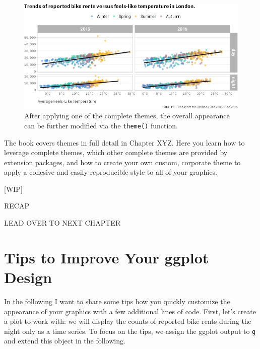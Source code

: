 \documentclass[
]{krantz}
\begin{document}
\begin{figure}
\centering
\includegraphics{bookdown_files/figure-latex/04ggplotThemeAdjustments-1.png}
\caption{\label{fig:04ggplotThemeAdjustments}After applying one of the complete themes, the overall appearance can be further modified via the \texttt{theme()} function.}
\end{figure}

The book covers themes in full detail in Chapter XYZ. Here you learn how to leverage complete themes, which other complete themes are provided by extension packages, and how to create your own custom, corporate theme to apply a cohesive and easily reproducible style to all of your graphics.

{[}WIP{]}

RECAP

LEAD OVER TO NEXT CHAPTER

\hypertarget{tips-to-improve-your-ggplot-design}{%
\chapter{Tips to Improve Your ggplot Design}\label{tips-to-improve-your-ggplot-design}}

In the following I want to share some tips how you quickly customize the appearance of your graphics with a few additional lines of code. First, let's create a plot to work with: we will display the counts of reported bike rents during the night only as a time series. To focus on the tips, we assign the ggplot output to \texttt{g} and extend this object in the following.
\end{document}
